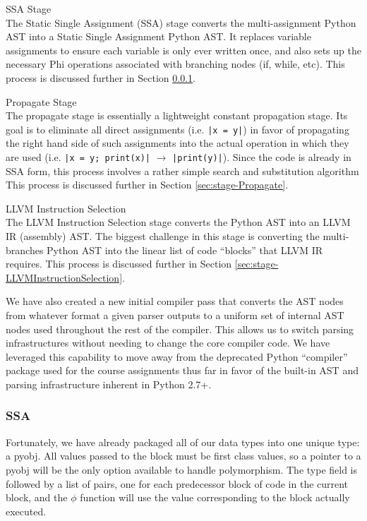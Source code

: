 \documentclass[11pt,twocolumn]{article}
\newenvironment{packed_desc}{
\begin{description}
  \setlength{\itemsep}{1pt}
  \setlength{\parskip}{0pt}
  \setlength{\parsep}{0pt}
}{\end{description}}
\begin{document}
\begin{packed_desc}
\item[SSA Stage] \hfill \\
  The Static Single Assignment (SSA) stage converts
  the multi-assignment Python AST into a Static Single Assignment
  Python AST. It replaces variable assignments to ensure each variable
  is only ever written once, and also sets up the necessary Phi operations
  associated with branching nodes (if, while, etc).
  This process is discussed further in Section \ref{sec:stage-SSA}.
\item[Propagate Stage] \hfill \\
  The propagate stage is essentially a
  lightweight constant propagation stage. Its goal is to eliminate
  all direct assignments (i.e. \texttt{|x = y|}) in favor of propagating
  the right hand side of such assignments into the actual operation in
  which they are used (i.e. \texttt{|x = y; print(x)|} $\rightarrow$
  \texttt{|print(y)|}). Since the code is already in SSA form, this
  process involves a rather simple search and substitution algorithm
  This process is discussed further in Section \ref{sec:stage-Propagate}.
\item[LLVM Instruction Selection] \hfill \\
  The LLVM Instruction Selection stage
  converts the Python AST into an LLVM IR (assembly) AST. The biggest
  challenge in this stage is converting the multi-branches Python AST
  into the linear list of code ``blocks'' that LLVM IR requires. This
  process is discussed further in Section
  \ref{sec:stage-LLVMInstructionSelection}.
\end{packed_desc}

We have also created a new initial compiler pass that converts the AST
nodes from whatever format a given parser outputs to a uniform set of
internal AST nodes used throughout the rest of the compiler. This
allows us to switch parsing infrastructures without needing to change
the core compiler code. We have leveraged this capability to move away
from the deprecated Python ``compiler'' package used for the course
assignments thus far in favor of the built-in AST and parsing
infrastructure inherent in Python 2.7+.

\subsubsection{SSA}
\label{sec:stage-SSA}

Fortunately, we have already packaged all of
our data types into one unique type: a pyobj. All values passed to the
block must be first class values, so a pointer to a pyobj will be the
only option available to handle polymorphism. The type field is
followed by a list of pairs, one for each predecessor block of code in
the current block, and the $\phi$ function will use the value
corresponding to the block actually executed.
\end{document}
